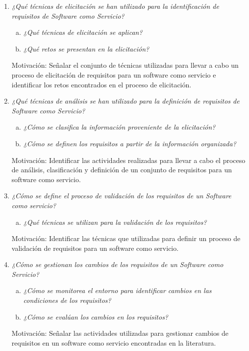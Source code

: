 \documentclass{article}
\begin{document}
\begin{enumerate}[P 1.-]
  \item\emph{¿Qué técnicas de elicitación se han utilizado para la identificación de requisitos de Software como Servicio? }
  \begin{enumerate}[(a)]
  \item \emph{¿Qué técnicas de elicitación se aplican?}
  \item \emph{¿Qué retos se presentan en la elicitación?}
  \end{enumerate}
  Motivación: Señalar el conjunto de técnicas utilizadas para llevar a cabo un proceso de elicitación de requisitos para un software como servicio e identificar los retos encontrados en el proceso de elicitación. 
  
  \item\emph{¿Qué técnicas de análisis se han utilizado para la definición de requisitos de Software como Servicio?}
  \begin{enumerate}[(a)]
  \item \emph{¿Cómo se clasifica la información proveniente de la elicitación?}
  \item \emph{¿Cómo se definen los requisitos a partir de la información organizada?}
  \end{enumerate}
  Motivación: Identificar las actividades realizadas para llevar a cabo el proceso de análisis, clasificación y definición de un conjunto de requisitos para un software como servicio.

  \item\emph{¿Cómo se define el proceso de validación de los requisitos de un Software como servicio?}
  \begin{enumerate}[(a)]
  \item \emph{¿Qué técnicas se utilizan para la validación de los requisitos? }
  \end{enumerate}
  Motivación: Identificar las técnicas que utilizadas para definir un proceso de validación de requisitos para un software como servicio.

  \item\emph{¿Cómo se gestionan los cambios de los requisitos de un Software como Servicio?}
  \begin{enumerate}[(a)]
  \item \emph{¿Cómo se monitorea el entorno para identificar cambios en las condiciones de los requisitos?}
  \item \emph{¿Cómo se evalúan los cambios en los requisitos?}
  \end{enumerate}
  Motivación: Señalar las actividades utilizadas para gestionar cambios de requisitos en un software como servicio encontradas en la literatura.
            

\end{enumerate}
\end{document}
